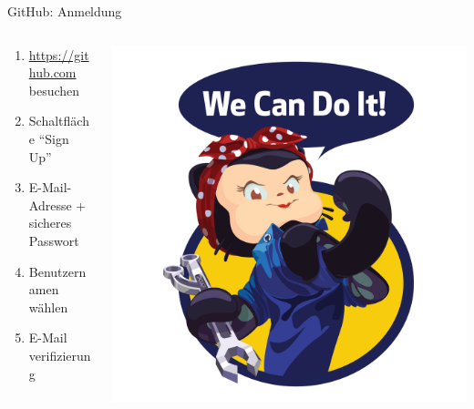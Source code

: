 \documentclass[compress,aspectratio=169]{beamer}
\begin{document}
	\begin{frame}{GitHub: Anmeldung}
		\begin{columns}
			\begin{column}{0.5\textwidth}
				\begin{enumerate}
					\item \url{https://github.com} besuchen
					\item Schaltfläche ``Sign Up''
					\item E-Mail-Adresse + sicheres Passwort
					\item Benutzernamen wählen
					\item E-Mail verifizierung
				\end{enumerate}
			\end{column}
			\begin{column}{0.5\textwidth}
				\includegraphics[width=\textwidth]{assets/we-can-do-it.png}
			\end{column}
		\end{columns}
	\end{frame}
\end{document}
